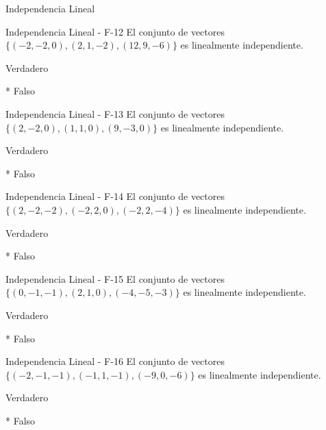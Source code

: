 \documentclass[a4,11pt]{aleph-notas}
\begin{document}
\begin{quiz}{Independencia Lineal}
\begin{multi}[numbering = none, shuffle = false]%
    {Independencia Lineal - F-12}
    El conjunto de vectores $\{ (-2,-2,0) , (2,1,-2), (12, 9, -6) \}$ es linealmente independiente.
    \item[] Verdadero 
    \item[]* Falso
\end{multi}

\begin{multi}[numbering = none, shuffle = false]%
    {Independencia Lineal - F-13}
    El conjunto de vectores $\{ (2,-2,0) , (1,1,0), (9, -3, 0) \}$ es linealmente independiente.
    \item[] Verdadero 
    \item[]* Falso
\end{multi}

\begin{multi}[numbering = none, shuffle = false]%
    {Independencia Lineal - F-14}
    El conjunto de vectores $\{ (2,-2,-2) , (-2,2,0), (-2, 2, -4) \}$ es linealmente independiente.
    \item[] Verdadero 
    \item[]* Falso
\end{multi}

\begin{multi}[numbering = none, shuffle = false]%
    {Independencia Lineal - F-15}
    El conjunto de vectores $\{ (0,-1,-1) , (2,1,0), (-4, -5, -3) \}$ es linealmente independiente.
    \item[] Verdadero 
    \item[]* Falso
\end{multi}

\begin{multi}[numbering = none, shuffle = false]%
    {Independencia Lineal - F-16}
    El conjunto de vectores $\{ (-2,-1,-1) , (-1,1,-1), (-9, 0, -6) \}$ es linealmente independiente.
    \item[] Verdadero 
    \item[]* Falso
\end{multi}


\end{quiz}
\end{document}
